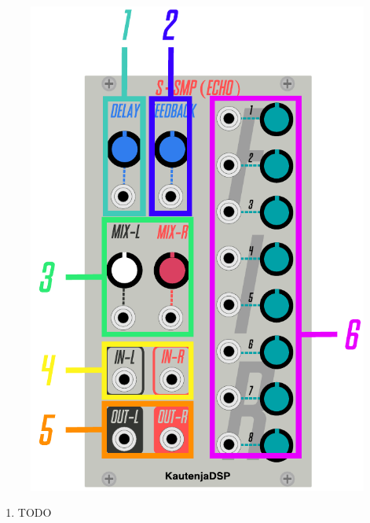 \documentclass[12pt,letter]{article}
\begin{document}
\begin{figure}[!htp]
\centering
\includegraphics{img/Interface}
\end{figure}

\clearpage
\begin{enumerate}
  \item TODO
\end{enumerate}


\clearpage
\renewcommand\refname{References \& Acknowledgments}
\nocite{*}


\end{document}

